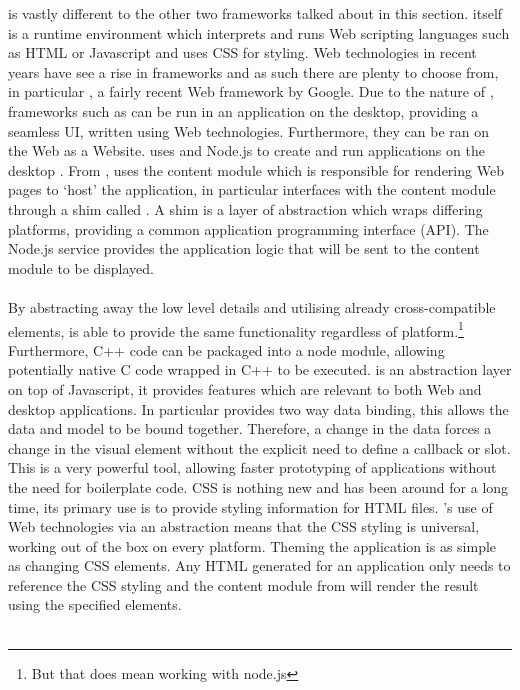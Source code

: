  is vastly different to the other two frameworks talked about in this section.  itself is a runtime environment which interprets and runs Web scripting languages such as HTML or Javascript and uses CSS for styling\cite{electron}. Web technologies in recent years have see a rise in frameworks and as such there are plenty to choose from, in particular , a fairly recent Web framework by Google. Due to the nature of , frameworks such as  can be run in an application on the desktop, providing a seamless UI, written using Web technologies. Furthermore, they can be ran on the Web as a Website.
%
   uses  and Node.js to create and run applications on the desktop \cite{electron_about}. From ,  uses the content module which is responsible for rendering Web pages to `host' the application, in particular  interfaces with the content module through a shim called \cite{electron_content_module}. A shim is a layer of abstraction which wraps differing platforms, providing a common application programming interface (API). The Node.js service provides the application logic that will be sent to the content module to be displayed.\\\\
  By abstracting away the low level details and utilising already cross-compatible elements,  is able to provide the same functionality regardless of platform.\footnote{But that does mean working with node.js} Furthermore, C++ code can be packaged into a node module, allowing potentially native C code wrapped in C++ to be executed.
   is an abstraction layer on top of Javascript, it provides features which are relevant to both Web and desktop applications\cite{angular}. In particular  provides two way data binding, this allows the data and model to be bound together\cite{angular_data_binding}. Therefore, a change in the data forces a change in the visual element without the explicit need to define a callback or slot. This is a very powerful tool, allowing faster prototyping of applications without the need for boilerplate code.
  CSS is nothing new and has been around for a long time, its primary use is to provide styling information for HTML files. 's use of Web technologies via an abstraction means that the CSS styling is universal, working out of the box on every platform. Theming the application is as simple as changing CSS elements. Any HTML generated for an application only needs to reference the CSS styling and the content module from  will render the result using the specified elements.\\\\
